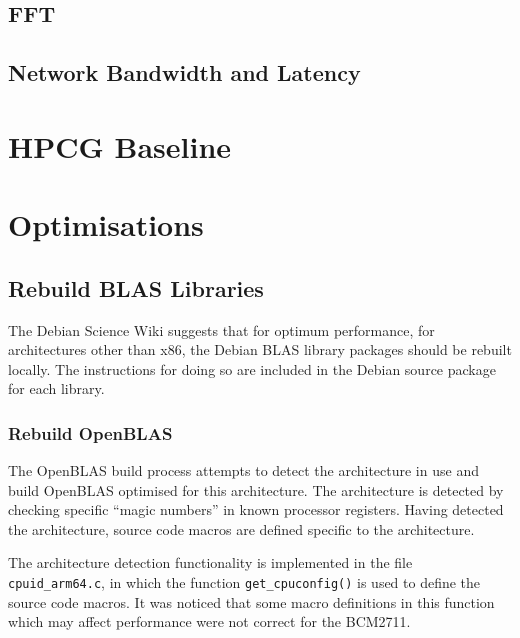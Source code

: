 \documentclass{report}
\begin{document}
%
%
\subsection{FFT}


%
%
\subsection{Network Bandwidth and Latency}



%
%
\section{HPCG Baseline}






%
%
\section{Optimisations}


%
%
\subsection{Rebuild BLAS Libraries}

The Debian Science Wiki suggests that for optimum performance, for architectures other than x86, the Debian BLAS library packages should be rebuilt locally. The instructions for doing so are included in the Debian source package for each library.


%
%
\subsubsection{Rebuild OpenBLAS}
The OpenBLAS build process attempts to detect the architecture in use and build OpenBLAS optimised for this architecture. The architecture is detected by checking specific ``magic numbers'' in known processor registers. Having detected the architecture, source code macros are defined specific to the architecture. 

The architecture detection functionality is implemented in the file \verb|cpuid_arm64.c|, in which the function \verb|get_cpuconfig()| is used to define the source code macros. It was noticed that some macro definitions in this function which may affect performance were not correct for the BCM2711.
\end{document}
